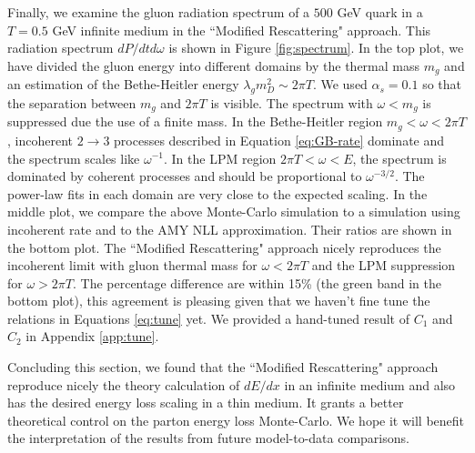 \documentclass[aps, prc, reprint, amsmath, groupedaddress, nofootinbib]{revtex4-1}
\begin{document}
Finally, we examine the gluon radiation spectrum of a $500$ GeV quark in a $T = 0.5$ GeV infinite medium in the ``Modified Rescattering" approach. 
This radiation spectrum $dP/dtd\omega$ is shown in Figure \ref{fig:spectrum}. 
In the top plot, we have divided the gluon energy into different domains by the thermal mass $m_g$ and an estimation of the Bethe-Heitler energy $\lambda_g m_D^2 \sim 2\pi T$.
We used $\alpha_s = 0.1$ so that the separation between $m_g$ and $2\pi T$ is visible.
The spectrum with $\omega < m_g$ is suppressed due the use of a finite mass.
In the Bethe-Heitler region $m_g < \omega < 2\pi T$, incoherent $2\rightarrow 3$ processes described in Equation \ref{eq:GB-rate} dominate and the spectrum scales like $\omega^{-1}$.
In the LPM region $2\pi T < \omega < E$, the spectrum is dominated by coherent processes and should be proportional to $\omega^{-3/2}$.
The power-law fits in each domain are very close to the expected scaling.
In the middle plot, we compare the above Monte-Carlo simulation to a simulation using incoherent rate and to the AMY NLL approximation. 
Their ratios are shown in the bottom plot.
The ``Modified Rescattering" approach nicely reproduces the incoherent limit with gluon thermal mass for $\omega < 2\pi T$ and the LPM suppression for $\omega > 2\pi T$. 
The percentage difference are within 15\% (the green band in the bottom plot), this agreement is pleasing given that we haven't fine tune the relations in Equations \ref{eq:tune} yet. 
We provided a hand-tuned result of $C_1$ and $C_2$ in Appendix \ref{app:tune}.

Concluding this section, we found that the ``Modified Rescattering" approach reproduce nicely the theory calculation of $dE/dx$ in an infinite medium and also has the desired energy loss scaling in a thin medium.
It grants a better theoretical control on the parton energy loss Monte-Carlo. 
We hope it will benefit the interpretation of the results from future model-to-data comparisons.
\end{document}

